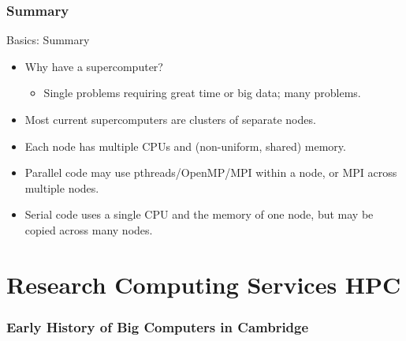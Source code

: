 \section{Summary}

\begin{frame}{Basics: Summary}

  \begin{itemize}
  \item<1->{\alert{Why have a supercomputer?}}
  \begin{itemize}\item<2->{Single problems requiring great time or big data; many problems.}\end{itemize}
  \item<3->{Most current supercomputers are \alert{clusters} of separate \alert{nodes}.}
  \item<4->{Each node has \alert{multiple CPUs} and \alert{(non-uniform, shared) memory}.}
  \item<5->{\alert{Parallel} code may use \alert{pthreads/OpenMP/MPI} within a node, or \alert{MPI} across multiple nodes.}
  \item<6->{\alert{Serial} code uses a single CPU and the memory of one node, but may be copied across many nodes.}
  \end{itemize}
  
\end{frame}

\part{Research Computing Services HPC}
\frame{\partpage}


\section{Early History of Big Computers in Cambridge}

